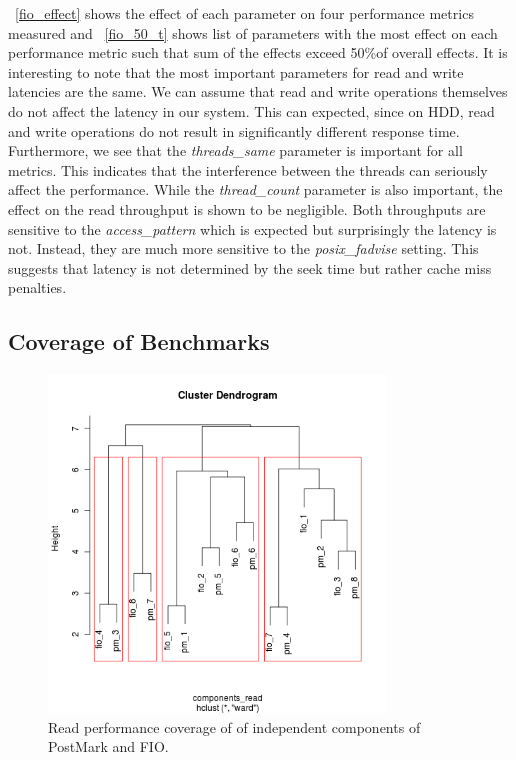 \figurename~\ref{fio_effect} shows the effect of each parameter on four performance metrics measured and \tablename~\ref{fio_50_t} shows list of parameters with the most effect on each performance metric such that sum of the effects exceed 50\%of overall effects. It is interesting to note that the most important parameters for read and write latencies are the same. We can assume that read and write operations themselves do not affect the latency in our system. This can expected, since on HDD, read and write operations do not result in significantly different response time.  Furthermore, we see that the \emph{threads\_same} parameter is important for all metrics. This indicates that the interference between the threads can seriously affect the performance. While the \emph{thread\_count} parameter is also important, the effect on the read throughput is shown to be negligible. Both throughputs are sensitive to the \emph{access\_pattern} which is expected but surprisingly the latency is not. Instead, they are much more sensitive to the \emph{posix\_fadvise} setting. This suggests that latency is not determined by the seek time but rather cache miss penalties. 

\subsection{Coverage of Benchmarks}


\begin{figure}[!t]
\centering
\includegraphics[width=0.8\textwidth]{figure/Rplot001.png}
\captionsetup{format=myformat}
\caption{Read performance coverage of of independent components of PostMark and FIO.}
\label{read_cov}
\end{figure}

